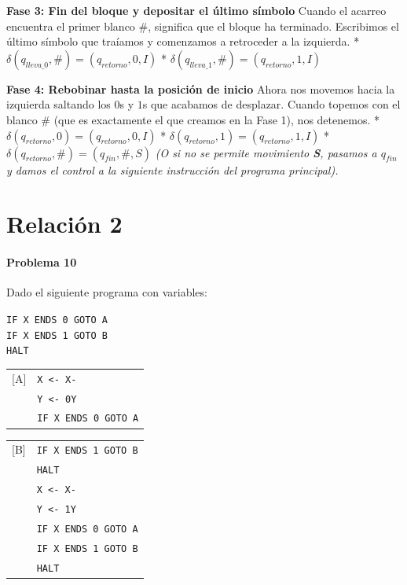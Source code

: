 \documentclass[12pt]{book} %
\begin{document}
\textbf{Fase 3: Fin del bloque y depositar el último símbolo} Cuando el
acarreo encuentra el primer blanco \(\#\), significa que el bloque ha
terminado. Escribimos el último símbolo que traíamos y comenzamos a
retroceder a la izquierda. *
\(\delta(q_{lleva\_0}, \#) = (q_{retorno}, 0, I)\) *
\(\delta(q_{lleva\_1}, \#) = (q_{retorno}, 1, I)\)

\textbf{Fase 4: Rebobinar hasta la posición de inicio} Ahora nos movemos
hacia la izquierda saltando los \(0\)s y \(1\)s que acabamos de
desplazar. Cuando topemos con el blanco \(\#\) (que es exactamente el
que creamos en la Fase 1), nos detenemos. *
\(\delta(q_{retorno}, 0) = (q_{retorno}, 0, I)\) *
\(\delta(q_{retorno}, 1) = (q_{retorno}, 1, I)\) *
\(\delta(q_{retorno}, \#) = (q_{fin}, \#, S)\) \emph{(O si no se permite
movimiento \textbf{S}, pasamos a \(q_{fin}\) y damos el control a la
siguiente instrucción del programa principal).}

\hypertarget{relaciuxf3n-2}{%
\section{Relación 2}\label{relaciuxf3n-2}}

\paragraph*{Problema 10}

Dado el siguiente programa con variables:

\begin{flushleft}
\hspace*{2em}\texttt{IF X ENDS 0 GOTO A} \\
\hspace*{2em}\texttt{IF X ENDS 1 GOTO B} \\
\hspace*{2em}\texttt{HALT}

\vspace{0.5em}
\begin{tabular}{@{}l l@{}}
[A] & \texttt{X <- X-} \\
    & \texttt{Y <- 0Y} \\
    & \texttt{IF X ENDS 0 GOTO A}
\end{tabular}

\vspace{0.8em}
\begin{tabular}{@{}l l@{}}
[B] & \texttt{IF X ENDS 1 GOTO B} \\
    & \texttt{HALT} \\
    & \texttt{X <- X-} \\
    & \texttt{Y <- 1Y} \\
    & \texttt{IF X ENDS 0 GOTO A} \\
    & \texttt{IF X ENDS 1 GOTO B} \\
    & \texttt{HALT}
\end{tabular}
\end{flushleft}
\end{document}
